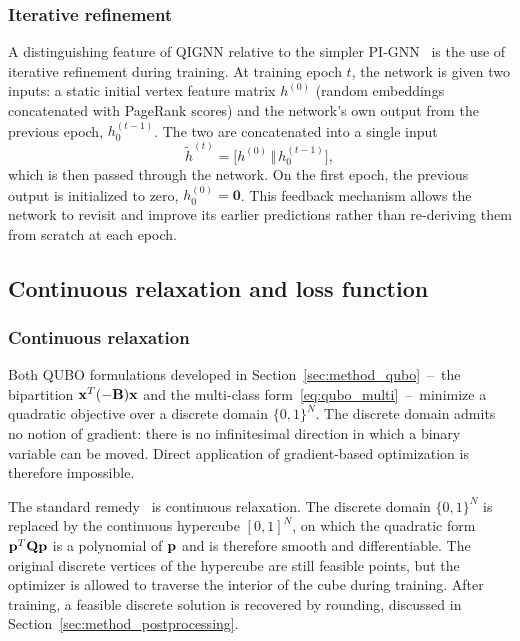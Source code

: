 \subsubsection{Iterative refinement}
\label{sec:method_iterative}

A distinguishing feature of QIGNN relative to the simpler
PI-GNN~\cite{schuetz2022combinatorial} is the use of iterative
refinement during training. At training epoch $t$, the network is
given two inputs: a static initial vertex feature matrix $h^{(0)}$
(random embeddings concatenated with PageRank scores) and the
network's own output from the previous epoch, $h_0^{(t-1)}$. The
two are concatenated into a single input
\begin{equation}
    \tilde{h}^{(t)} = \bigl[ h^{(0)} \,\Vert\, h_0^{(t-1)} \bigr],
    \label{eq:iterative_input}
\end{equation}
which is then passed through the network. On the first epoch, the
previous output is initialized to zero, $h_0^{(0)} = \mathbf{0}$.
This feedback mechanism allows the network to revisit and improve
its earlier predictions rather than re-deriving them from scratch
at each epoch.


\subsection{Continuous relaxation and loss function}
\label{sec:method_loss}

\subsubsection{Continuous relaxation}
\label{sec:method_relaxation}

Both QUBO formulations developed in
Section~\ref{sec:method_qubo}~--~the bipartition $\mathbf{x}^T (-\mathbf{B}) \mathbf{x}$
and the multi-class form~\eqref{eq:qubo_multi}~--~minimize a
quadratic objective over a discrete domain $\{0, 1\}^N$. The
discrete domain admits no notion of gradient: there is no
infinitesimal direction in which a binary variable can be moved.
Direct application of gradient-based optimization is therefore
impossible.

The standard remedy~\cite{schuetz2022combinatorial, lucas2014ising}
is continuous relaxation. The discrete domain $\{0, 1\}^N$ is
replaced by the continuous hypercube $[0, 1]^N$, on which the
quadratic form $\mathbf{p}^T \mathbf{Q} \mathbf{p}$ is a polynomial of $\mathbf{p}$ and is
therefore smooth and differentiable. The original discrete vertices
of the hypercube are still feasible points, but the optimizer is
allowed to traverse the interior of the cube during training. After
training, a feasible discrete solution is recovered by rounding,
discussed in Section~\ref{sec:method_postprocessing}.

